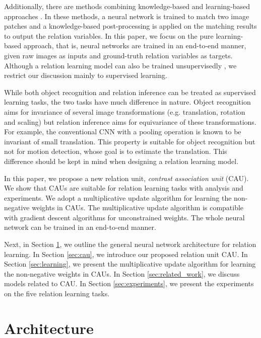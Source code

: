 \documentclass[conference]{IEEEtran}
\begin{document}
Additionally, there are methods combining knowledge-based and learning-based approaches  \cite{zagoruyko2015learning,zbontar2016stereo,shaked2016improved,bailer2016cnn}.
In these methods, a neural network is trained to match two image patches and a knowledge-based post-processing is applied on the matching results to output the relation variables. In this paper, we focus on the pure learning-based approach, that is, neural networks are trained in an end-to-end manner, given raw images as inputs and ground-truth relation variables as targets.
Although a relation learning model can also be trained unsupervisedly \cite{memisevic2010learning,konda2013unsupervised,yu2016back}, we restrict our discussion mainly to supervised learning. 

While both object recognition and relation inference can be treated as supervised learning tasks, the two tasks have much difference in nature. 
Object recognition aims for invariance of several image transformations (e.g. translation, rotation and scaling) but relation inference aims for equivariance of these transformations. For example, the conventional CNN with a pooling operation is known to be invariant of small translation. This property is suitable for object recognition but not for motion detection, whose goal is to estimate the translation. This difference should be kept in mind when designing a relation learning model.

In this paper, we propose a new relation unit, \textit{contrast association unit} (CAU). We show that CAUs are suitable for relation learning tasks with analysis and experiments. We adopt a multiplicative update algorithm for learning the non-negative weights in CAUs. The multiplicative update algorithm is compatible with gradient descent algorithms for unconstrained weights. The whole neural network can be trained in an end-to-end manner. 


Next, in Section \ref{sec:arch}, we outline the general neural network architecture for relation learning. In Section \ref{sec:cau}, we introduce our proposed relation unit CAU. In Section \ref{sec:learning}, we present the multiplicative update algorithm for learning the non-negative weights in CAUs. In Section \ref{sec:related_work}, we discuss models related to CAU. In Section \ref{sec:experiments}, we present the experiments on the five relation learning tasks. 








\section{Architecture}\label{sec:arch}
\end{document}
